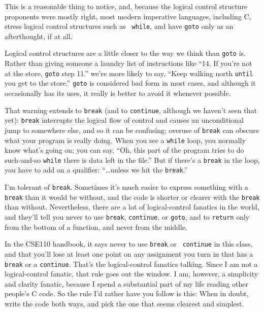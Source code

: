 This is a reasonable thing to notice, and, because the logical control
structure proponents were mostly right, most modern imperative
languages, including C, stress logical control structures such as {\tt
while}, and have {\tt goto} only as an afterthought, if at all.

Logical control structures are a little closer to the way we think than
{\tt goto} is.  Rather than giving someone a laundry list of
instructions like ``14. If you're not at the store, {\tt goto} step
11.'' we're more likely to say, ``Keep walking north {\tt until} you get
to the store.''  {\tt goto} is considered bad form in most cases, and
although it occasionally has its uses, it really is better to avoid it
whenever possible.

That warning extends to {\tt break} (and to {\tt continue}, although we
haven't seen that yet): {\tt break} interrupts the logical flow of
control and causes an unconditional jump to somewhere else, and so it
can be confusing; overuse of {\tt break} can obscure what your program
is really doing.  When you see a {\tt while} loop, you normally know
what's going on; you can say, ``Oh, this part of the program tries to do
such-and-so {\tt while} there is data left in the file.''  But if
there's a {\tt break} in the loop, you have to add on a qualifier:
``\ldots unless we hit the {\tt break}.''

I'm tolerant of {\tt break}.  Sometimes it's much easier to express
something with a {\tt break} than it would be without, and the code is
shorter or clearer with the {\tt break} than without.  Nevertheless,
there are a lot of logical-control fanatics in the world, and they'll
tell you never to use {\tt break}, {\tt continue}, or {\tt goto}, and to
{\tt return} only from the bottom of a function, and never from the
middle.  

In the CSE110 handbook, it says never to use {\tt break} or {\tt
continue} in this class, and that you'll lose at least one point on any
assignment you turn in that has a {\tt break} or a {\tt continue}.
That's the logical-control fanatics talking.  Since I am not a
logical-control fanatic, that rule goes out the window.  I am, however,
a simplicity and clarity fanatic, because I spend a substantial part of
my life reading other people's C code.  So the rule I'd rather have you
follow is this: When in doubt, write the code both ways, and pick the
one that seems clearest and simplest.
